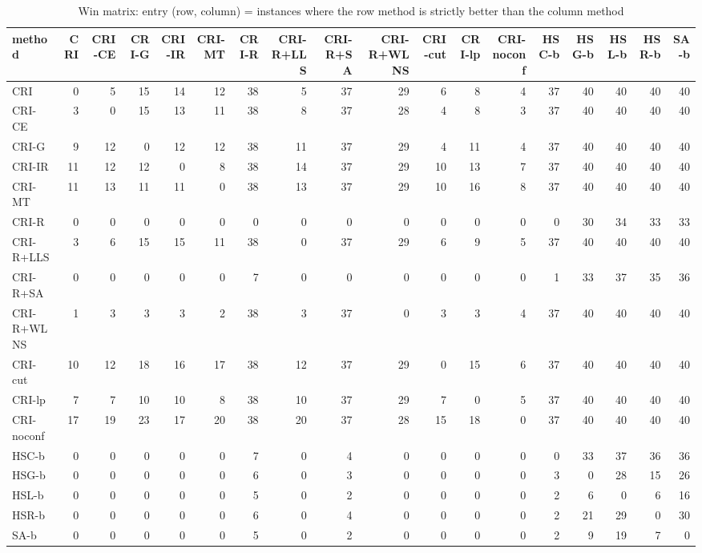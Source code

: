 \begin{table}[htbp]
\centering
\small
\caption{Win matrix: entry (row, column) = instances where the row method is strictly better than the column method}
\label{tab:E5_ablation_b10_wins}
\begin{tabular}{lrrrrrrrrrrrrrrrrr}
\toprule
method & CRI & CRI-CE & CRI-G & CRI-IR & CRI-MT & CRI-R & CRI-R+LLS & CRI-R+SA & CRI-R+WLNS & CRI-cut & CRI-lp & CRI-noconf & HSC-b & HSG-b & HSL-b & HSR-b & SA-b \\
\midrule
CRI & 0 & 5 & 15 & 14 & 12 & 38 & 5 & 37 & 29 & 6 & 8 & 4 & 37 & 40 & 40 & 40 & 40 \\
CRI-CE & 3 & 0 & 15 & 13 & 11 & 38 & 8 & 37 & 28 & 4 & 8 & 3 & 37 & 40 & 40 & 40 & 40 \\
CRI-G & 9 & 12 & 0 & 12 & 12 & 38 & 11 & 37 & 29 & 4 & 11 & 4 & 37 & 40 & 40 & 40 & 40 \\
CRI-IR & 11 & 12 & 12 & 0 & 8 & 38 & 14 & 37 & 29 & 10 & 13 & 7 & 37 & 40 & 40 & 40 & 40 \\
CRI-MT & 11 & 13 & 11 & 11 & 0 & 38 & 13 & 37 & 29 & 10 & 16 & 8 & 37 & 40 & 40 & 40 & 40 \\
CRI-R & 0 & 0 & 0 & 0 & 0 & 0 & 0 & 0 & 0 & 0 & 0 & 0 & 0 & 30 & 34 & 33 & 33 \\
CRI-R+LLS & 3 & 6 & 15 & 15 & 11 & 38 & 0 & 37 & 29 & 6 & 9 & 5 & 37 & 40 & 40 & 40 & 40 \\
CRI-R+SA & 0 & 0 & 0 & 0 & 0 & 7 & 0 & 0 & 0 & 0 & 0 & 0 & 1 & 33 & 37 & 35 & 36 \\
CRI-R+WLNS & 1 & 3 & 3 & 3 & 2 & 38 & 3 & 37 & 0 & 3 & 3 & 4 & 37 & 40 & 40 & 40 & 40 \\
CRI-cut & 10 & 12 & 18 & 16 & 17 & 38 & 12 & 37 & 29 & 0 & 15 & 6 & 37 & 40 & 40 & 40 & 40 \\
CRI-lp & 7 & 7 & 10 & 10 & 8 & 38 & 10 & 37 & 29 & 7 & 0 & 5 & 37 & 40 & 40 & 40 & 40 \\
CRI-noconf & 17 & 19 & 23 & 17 & 20 & 38 & 20 & 37 & 28 & 15 & 18 & 0 & 37 & 40 & 40 & 40 & 40 \\
HSC-b & 0 & 0 & 0 & 0 & 0 & 7 & 0 & 4 & 0 & 0 & 0 & 0 & 0 & 33 & 37 & 36 & 36 \\
HSG-b & 0 & 0 & 0 & 0 & 0 & 6 & 0 & 3 & 0 & 0 & 0 & 0 & 3 & 0 & 28 & 15 & 26 \\
HSL-b & 0 & 0 & 0 & 0 & 0 & 5 & 0 & 2 & 0 & 0 & 0 & 0 & 2 & 6 & 0 & 6 & 16 \\
HSR-b & 0 & 0 & 0 & 0 & 0 & 6 & 0 & 4 & 0 & 0 & 0 & 0 & 2 & 21 & 29 & 0 & 30 \\
SA-b & 0 & 0 & 0 & 0 & 0 & 5 & 0 & 2 & 0 & 0 & 0 & 0 & 2 & 9 & 19 & 7 & 0 \\
\bottomrule
\end{tabular}
\end{table}
